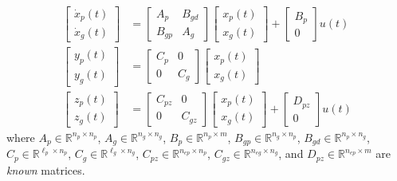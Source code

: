 \begin{equation}
  \label{eqn.wholeSystem}
  \begin{split}
    \begin{bmatrix}
      \dot{x}_{p}(t) \\
      \dot{x}_{g}(t)
    \end{bmatrix}
    &=
    \begin{bmatrix}
      A_{p} & B_{gd} \\
      B_{gp} & A_{g}
    \end{bmatrix}
    \begin{bmatrix}
      x_{p}(t) \\
      x_{g}(t)
    \end{bmatrix}
    +
    \begin{bmatrix}
      B_{p} \\
      0
    \end{bmatrix}
    u(t) \\
    \begin{bmatrix}
      y_{p}(t) \\
      y_{g}(t)
    \end{bmatrix}
    &=
    \begin{bmatrix}
      C_{p} & 0 \\
      0 & C_{g}
    \end{bmatrix}
    \begin{bmatrix}
      x_{p}(t) \\
      x_{g}(t)
    \end{bmatrix} \\
    \begin{bmatrix}
      z_{p}(t) \\
      z_{g}(t)
    \end{bmatrix}
    &=
    \begin{bmatrix}
      C_{pz} & 0 \\
      0 & C_{gz}
    \end{bmatrix}
    \begin{bmatrix}
      x_{p}(t) \\
      x_{g}(t)
    \end{bmatrix}
    +
    \begin{bmatrix}
      D_{pz} \\
      0
    \end{bmatrix}
    u(t)
  \end{split}
\end{equation}
where $A_{p}\in\mathbb{R}^{n_{p}\times n_{p}}$, $A_{g}\in\mathbb{R}^{n_{g}\times n_{g}}$, $B_{p}\in\mathbb{R}^{n_{p}\times m}$, $B_{gp}\in\mathbb{R}^{n_{g}\times n_{p}}$, $B_{gd}\in\mathbb{R}^{n_{p}\times n_{g}}$, $C_{p}\in\mathbb{R}^{\ell_{p} \times n_{p}}$, $C_{g}\in\mathbb{R}^{\ell_{g}\times n_{g}}$, $C_{pz}\in\mathbb{R}^{n_{ep}\times n_{p}}$, $C_{gz}\in\mathbb{R}^{n_{eg}\times n_{g}}$, and $D_{pz}\in\mathbb{R}^{n_{ep}\times m}$ are \textit{known} matrices.
